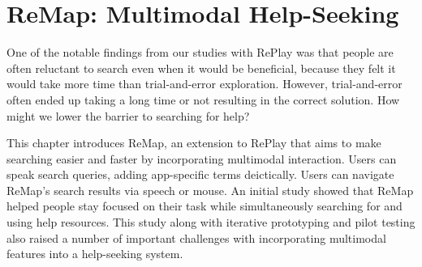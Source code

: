 


\chapter{ReMap: Multimodal Help-Seeking}
One of the notable findings from our studies with RePlay was that people are often reluctant to search even when it would be beneficial, because they felt it would take more time than trial-and-error exploration. However, trial-and-error often ended up taking a long time or not resulting in the correct solution. How might we lower the barrier to searching for help?

This chapter introduces ReMap, an extension to RePlay that aims to make searching easier and faster by incorporating multimodal interaction. Users can speak search queries, adding app-specific terms deictically. Users can navigate ReMap's search results via speech or mouse. An initial study showed that ReMap helped people stay focused on their task while simultaneously searching for and using help resources. This study along with iterative prototyping and pilot testing also raised a number of important challenges with incorporating multimodal features into a help-seeking system.





